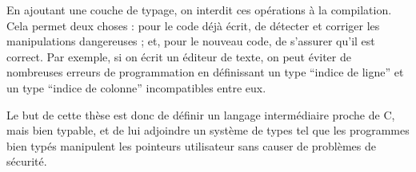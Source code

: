 En ajoutant une couche de typage, on interdit ces opérations à la compilation.
Cela permet deux choses : pour le code déjà écrit, de détecter et corriger les
manipulations dangereuses ; et, pour le nouveau code, de s'assurer qu'il est
correct. Par exemple, si on écrit un éditeur de texte, on peut éviter de
nombreuses erreurs de programmation en définissant un type \enquote{indice de
ligne} et un type \enquote{indice de colonne} incompatibles entre eux.

Le but de cette thèse est donc de définir un langage intermédiaire proche de C,
mais bien typable, et de lui adjoindre un système de types tel que les
programmes bien typés manipulent les pointeurs utilisateur sans causer de
problèmes de sécurité.

